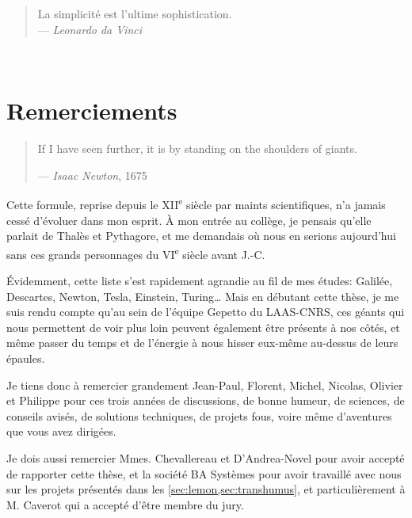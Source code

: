 ~

\newpage

~

\vfill

\begin{quote}
    \par\raggedleft
    La simplicité est l'ultime sophistication. \\
    --- \emph{Leonardo da Vinci}

\end{quote}

\vfill

\newpage

~

\newpage

\section*{Remerciements}

\begin{quote}
    If I have seen further, it is by standing on the shoulders of giants.
    \par\raggedleft--- \emph{Isaac Newton}, 1675
\end{quote}

Cette formule, reprise depuis le XII\textsuperscript{e} siècle par maints scientifiques, n'a jamais cessé d'évoluer
dans mon esprit. À mon entrée au collège, je pensais qu'elle parlait de Thalès et Pythagore, et me demandais où nous
en serions aujourd'hui sans ces grands personnages du VI\textsuperscript{e} siècle avant J.-C.

Évidemment, cette liste s'est rapidement agrandie au fil de mes études: Galilée, Descartes, Newton, Tesla, Einstein,
Turing\ldots{} Mais en débutant cette thèse, je me suis rendu compte qu'au sein de l'équipe Gepetto du LAAS-CNRS, ces
géants qui nous permettent de voir plus loin peuvent également être présents à nos côtés, et même passer du temps et de
l'énergie à nous hisser eux-même au-dessus de leurs épaules.

Je tiens donc à remercier grandement Jean-Paul, Florent, Michel, Nicolas, Olivier et Philippe pour ces trois années
de discussions, de bonne humeur, de sciences, de conseils avisés, de solutions techniques, de projets fous, voire même
d'aventures que vous avez dirigées.

Je dois aussi remercier Mmes. Chevallereau et D'Andrea-Novel pour avoir accepté de rapporter cette thèse, et la société
BA Systèmes pour avoir travaillé avec nous sur les projets présentés dans les \cref{sec:lemon,sec:transhumus}, et
particulièrement à M. Caverot qui a accepté d'être membre du jury.

